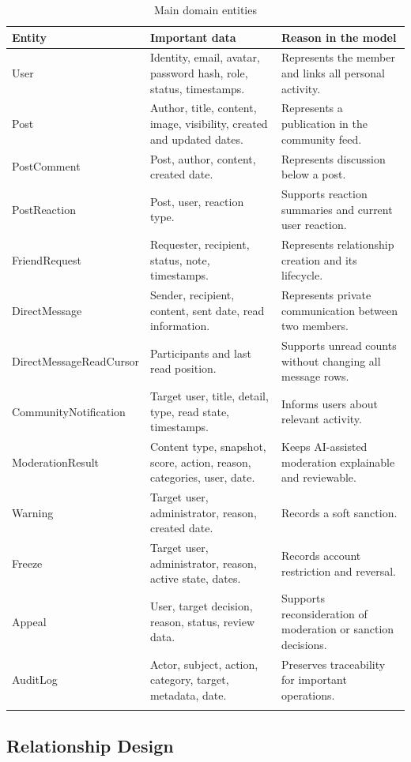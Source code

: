 \begin{longtable}{|m{3.4cm}|m{5.4cm}|m{5.2cm}|}
\hline
\textbf{Entity} & \textbf{Important data} & \textbf{Reason in the model} \\
\hline
User & Identity, email, avatar, password hash, role, status, timestamps. & Represents the member and links all personal activity. \\
\hline
Post & Author, title, content, image, visibility, created and updated dates. & Represents a publication in the community feed. \\
\hline
PostComment & Post, author, content, created date. & Represents discussion below a post. \\
\hline
PostReaction & Post, user, reaction type. & Supports reaction summaries and current user reaction. \\
\hline
FriendRequest & Requester, recipient, status, note, timestamps. & Represents relationship creation and its lifecycle. \\
\hline
DirectMessage & Sender, recipient, content, sent date, read information. & Represents private communication between two members. \\
\hline
DirectMessageReadCursor & Participants and last read position. & Supports unread counts without changing all message rows. \\
\hline
CommunityNotification & Target user, title, detail, type, read state, timestamps. & Informs users about relevant activity. \\
\hline
ModerationResult & Content type, snapshot, score, action, reason, categories, user, date. & Keeps AI-assisted moderation explainable and reviewable. \\
\hline
Warning & Target user, administrator, reason, created date. & Records a soft sanction. \\
\hline
Freeze & Target user, administrator, reason, active state, dates. & Records account restriction and reversal. \\
\hline
Appeal & User, target decision, reason, status, review data. & Supports reconsideration of moderation or sanction decisions. \\
\hline
AuditLog & Actor, subject, action, category, target, metadata, date. & Preserves traceability for important operations. \\
\hline
\caption{Main domain entities}
\end{longtable}

\subsection*{Relationship Design}

